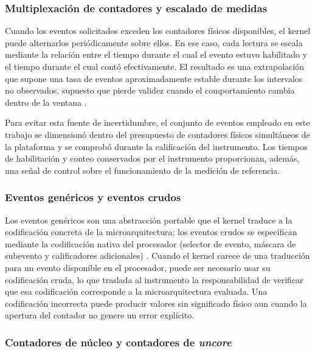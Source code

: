 \documentclass[12pt,oneside,spanish]{book}
\begin{document}
\subsubsection{Multiplexación de contadores y escalado de medidas}
\label{sec:multiplexacion}

Cuando los eventos solicitados exceden los contadores físicos disponibles,
el kernel puede alternarlos periódicamente sobre ellos. En ese caso, cada
lectura se escala mediante la relación entre el tiempo durante el cual el
evento estuvo habilitado y el tiempo durante el cual contó efectivamente. El
resultado es una extrapolación que supone una tasa de eventos aproximadamente
estable durante los intervalos no observados, supuesto que pierde validez
cuando el comportamiento cambia dentro de la ventana \cite{Liu2024}.

Para evitar esta fuente de incertidumbre, el conjunto de eventos empleado en
este trabajo se dimensionó dentro del presupuesto de contadores físicos
simultáneos de la plataforma y se comprobó durante la calificación del
instrumento. Los tiempos de habilitación y conteo conservados por el
instrumento proporcionan, además, una señal de control sobre el funcionamiento
de la medición de referencia.

\subsubsection{Eventos genéricos y eventos crudos}

Los eventos genéricos son una abstracción portable que el kernel traduce a
la codificación concreta de la microarquitectura; los eventos crudos se
especifican mediante la codificación nativa del procesador (selector de evento,
máscara de subevento y calificadores adicionales)
\cite{Weaver2015,IntelSDM2026}. Cuando el kernel carece de una traducción para
un evento disponible en el procesador, puede ser necesario usar su codificación
cruda, lo que traslada al instrumento la responsabilidad de verificar que esa
codificación corresponde a la microarquitectura evaluada. Una codificación
incorrecta puede producir valores sin significado físico aun cuando la apertura
del contador no genere un error explícito.

\subsubsection{Contadores de núcleo y contadores de \textit{uncore}}
\label{sec:uncore}
\end{document}
